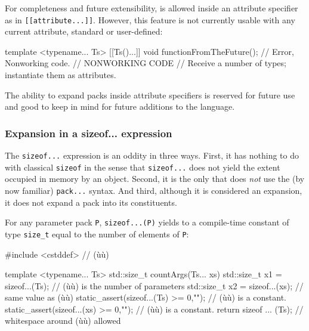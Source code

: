 \noindent For completeness and future extensibility,  is
allowed inside an attribute specifier as in \lstinline![[attribute...]]!.
However, this feature is not currently usable with any current
attribute, standard or user-defined:

\begin{emcppslisting}[emcppsignore={gibberish}]
template <typename... Ts>
[[Ts()...]] void functionFromTheFuture();  // Error, Nonworking code.
    // NONWORKING CODE
    // Receive a number of types; instantiate them as attributes.
\end{emcppslisting}
    

\noindent The ability to expand packs inside attribute specifiers is reserved for
future use and good to keep in mind for future additions to the
language.

\subsubsection[Expansion in a \lstinline!sizeof...! expression]{Expansion in a {\SubsubsecCode sizeof...} expression}\label{expansion-in-a-sizeof...-expression}

The \lstinline!sizeof...! expression is an oddity in three ways. First, it
has nothing to do with classical \lstinline!sizeof! in the sense that
\lstinline!sizeof...! does not yield the extent occupied in memory by an
object. Second, it is the only  that
does \emph{not} use the (by now familiar) \lstinline!pack...! syntax. And
third, although it is considered an expansion, it does not expand a pack
into its constituents.

For any parameter pack \lstinline!P!, \lstinline!sizeof...(P)! yields to a
compile-time constant of type \lstinline!size_t! equal to the number of
elements of \lstinline!P!:

\begin{emcppshiddenlisting}[emcppsbatch=e32]
#include <cstddef>  // (ù{}ù)
\end{emcppshiddenlisting}
\begin{emcppslisting}[emcppsbatch=e32]
template <typename... Ts>
std::size_t countArgs(Ts... xs)
{
    std::size_t x1 = sizeof...(Ts);        // (ù{}ù) is the number of parameters
    std::size_t x2 = sizeof...(xs);        // same value as (ù{}ù)
    static_assert(sizeof...(Ts) >= 0,"");  // (ù{}ù) is a constant.
    static_assert(sizeof...(xs) >= 0,"");  // (ù{}ù) is a constant.
    return sizeof ... (Ts);                // whitespace around (ù{}ù) allowed
}
\end{emcppslisting}
    

